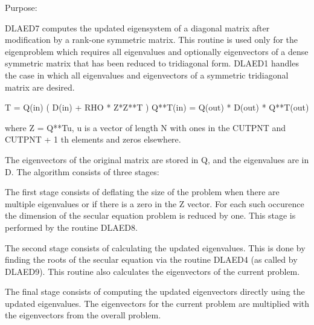  \begin{DoxyParagraph}{Purpose\+: }
\begin{DoxyVerb} DLAED7 computes the updated eigensystem of a diagonal
 matrix after modification by a rank-one symmetric matrix. This
 routine is used only for the eigenproblem which requires all
 eigenvalues and optionally eigenvectors of a dense symmetric matrix
 that has been reduced to tridiagonal form.  DLAED1 handles
 the case in which all eigenvalues and eigenvectors of a symmetric
 tridiagonal matrix are desired.

   T = Q(in) ( D(in) + RHO * Z*Z**T ) Q**T(in) = Q(out) * D(out) * Q**T(out)

    where Z = Q**Tu, u is a vector of length N with ones in the
    CUTPNT and CUTPNT + 1 th elements and zeros elsewhere.

    The eigenvectors of the original matrix are stored in Q, and the
    eigenvalues are in D.  The algorithm consists of three stages:

       The first stage consists of deflating the size of the problem
       when there are multiple eigenvalues or if there is a zero in
       the Z vector.  For each such occurence the dimension of the
       secular equation problem is reduced by one.  This stage is
       performed by the routine DLAED8.

       The second stage consists of calculating the updated
       eigenvalues. This is done by finding the roots of the secular
       equation via the routine DLAED4 (as called by DLAED9).
       This routine also calculates the eigenvectors of the current
       problem.

       The final stage consists of computing the updated eigenvectors
       directly using the updated eigenvalues.  The eigenvectors for
       the current problem are multiplied with the eigenvectors from
       the overall problem.\end{DoxyVerb}
 
\end{DoxyParagraph}


